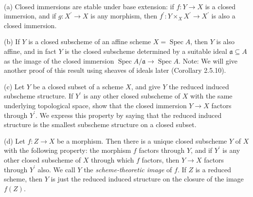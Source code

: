 \begin{exe}
	\label{2.3.11}
	\ 
	
	(a) Closed immersions are stable under base extension: if $f: Y \rightarrow X$ is a closed immersion, and if $g:X^{\prime} \rightarrow X$ is any morphism, then $f^{\prime}: Y \times_{X} X^{\prime} \rightarrow X^{\prime}$ is also a closed immersion.
	
	(b) If $Y$ is a closed subscheme of an affine scheme $X=\operatorname{Spec} A$, then $Y$ is also affine, and in fact $Y$ is the closed subscheme determined by a suitable ideal $\mathfrak{a} \subseteq A$ as the image of the closed immersion $\operatorname{Spec} A / \mathfrak{a} \rightarrow \operatorname{Spec} A$. Note: We will give another proof of this result using sheaves of ideals later (Corollary 2.5.10).
	
	(c) Let $Y$ be a closed subset of a scheme $X$, and give $Y$ the reduced induced subscheme structure. If $Y^{\prime}$ is any other closed subscheme of $X$ with the same underlying topological space, show that the closed immersion $Y \rightarrow X$ factors through $Y^{\prime} .$ We express this property by saying that the reduced induced structure is the smallest subscheme structure on a closed subset.
	
	(d) Let $f: Z \rightarrow X$ be a morphism. Then there is a unique closed subscheme $Y$ of $X$ with the following property: the morphism $f$ factors through $Y$, and if $Y^{\prime}$ is any other closed subscheme of $X$ through which $f$ factors, then $Y \rightarrow X$ factors through $Y^{\prime}$ also. We call $Y$ the \emph{scheme-theoretic image} of $f $. If $Z$ is a reduced scheme, then $Y$ is just the reduced induced structure on the closure of the image $f(Z)$.
\end{exe}

